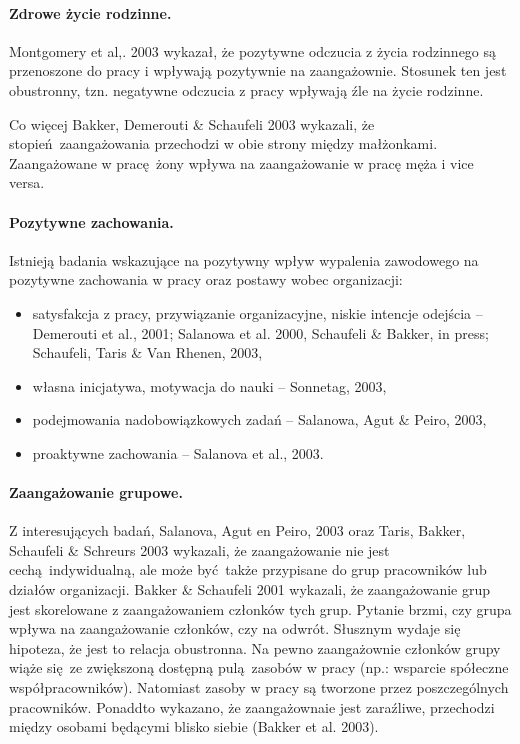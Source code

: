 \paragraph{Zdrowe życie rodzinne.}
Montgomery et al,. 2003 wykazał, że pozytywne odczucia z życia rodzinnego są przenoszone do pracy i wpływają pozytywnie na zaangażownie. Stosunek ten jest obustronny, tzn. negatywne odczucia z pracy wpływają źle na życie rodzinne. 

Co więcej Bakker, Demerouti \& Schaufeli 2003 wykazali, że stopień zaangażowania przechodzi w obie strony między małżonkami. Zaangażowane w pracę żony wpływa na zaangażowanie w pracę męża i vice versa.
\paragraph{Pozytywne zachowania.}
Istnieją badania wskazujące na pozytywny wpływ wypalenia zawodowego na pozytywne zachowania w pracy oraz postawy wobec organizacji:
\begin{itemize}
\item satysfakcja z pracy, przywiązanie organizacyjne, niskie intencje odejścia -- Demerouti et al., 2001; Salanowa et al. 2000, Schaufeli \& Bakker, in press; Schaufeli, Taris \& Van Rhenen, 2003,
\item własna inicjatywa, motywacja do nauki -- Sonnetag, 2003,
\item podejmowania nadobowiązkowych zadań -- Salanowa, Agut \& Peiro, 2003,
\item proaktywne zachowania -- Salanova et al., 2003.
\end{itemize}
\paragraph{Zaangażowanie grupowe.}
Z interesujących badań, Salanova, Agut en Peiro, 2003 oraz Taris, Bakker, Schaufeli \& Schreurs 2003 wykazali, że zaangażowanie nie jest cechą indywidualną, ale może być także przypisane do grup pracowników lub działów organizacji. Bakker \& Schaufeli 2001 wykazali, że zaangażowanie grup jest skorelowane z zaangażowaniem członków tych grup. Pytanie brzmi, czy grupa wpływa na zaangażowanie członków, czy na odwrót. Słusznym wydaje się hipoteza, że jest to relacja
obustronna. Na pewno zaangażownie członków grupy wiąże się ze zwiększoną dostępną pulą zasobów w pracy (np.: wsparcie spółeczne współpracowników). Natomiast zasoby w pracy są tworzone przez poszczególnych pracowników. Ponaddto wykazano, że zaangażownaie jest zaraźliwe, przechodzi między osobami będącymi blisko siebie (Bakker et al. 2003).

